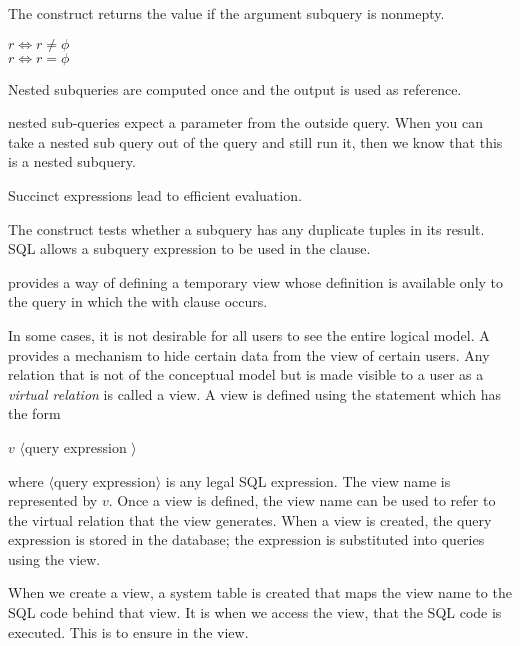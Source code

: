 \documentclass{article}
\begin{document}
The  construct returns the value  if the argument subquery is nonmepty. 
\begin{center}
   $r \Leftrightarrow r \neq \phi$ \\ 
   $r \Leftrightarrow r = \phi$
\end{center}

\begin{remark}
  Nested subqueries are computed once and the output is used as reference. 
\end{remark}

 nested sub-queries expect a parameter from the outside query. When you can take a nested sub query out of the query and still run it, then we know that this is a  nested subquery. 

\begin{remark}
  Succinct expressions lead to efficient evaluation. 
\end{remark}

The  construct tests whether a subquery has any duplicate tuples in its result. SQL allows a subquery expression to be used in the  clause. 

\begin{definition}
  provides a way of defining a temporary view whose definition is available only to the query in which the with clause occurs. 
\end{definition}

In some cases, it is not desirable for all users to see the entire logical model. A  provides a mechanism to hide certain data from the view of certain users. Any relation that is not of the conceptual model but is made visible to a user as a \emph{virtual relation} is called a view. A view is defined using the  statement which has the form 
\begin{center}
   $v$  $\langle$query expression $\rangle$
\end{center}
where $\langle$query expression$\rangle$ is any legal SQL expression. The view name is represented by $v$. Once a view is defined, the view name can be used to refer to the virtual relation that the view generates. When a view is created, the query expression is stored in the database; the expression is substituted into queries using the view. 

\begin{remark}
  When we create a view, a system table is created that maps the view name to the SQL code behind that view. It is when we access the view, that the SQL code is executed. This is to ensure  in the view. 
\end{remark}
\end{document}
